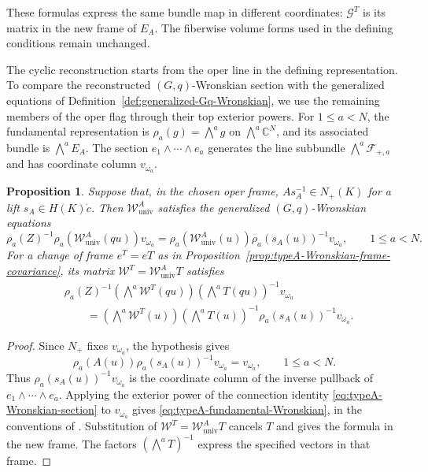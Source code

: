 \documentclass[11pt,leqno]{amsart}
\numberwithin{equation}{section}
\theoremstyle{plain}
\newtheorem{proposition}[theorem]{Proposition}
\theoremstyle{definition}
\theoremstyle{plain}
\theoremstyle{definition}
\theoremstyle{remark}
\begin{document}
These formulas express the same bundle map in different coordinates: $\mathscr G^T$ is its matrix in the new frame of $E_A$. The fiberwise volume forms used in the defining conditions remain unchanged.

The cyclic reconstruction starts from the oper line in the defining representation. To compare the reconstructed $(G,q)$-Wronskian section with the generalized equations of Definition~\ref{def:generalized-Gq-Wronskian}, we use the remaining members of the oper flag through their top exterior powers. For $1\le a<N$, the fundamental representation is $\rho_a(g)=\bigwedge^a g$ on $\bigwedge^a\mathbb C^N$, and its associated bundle is $\bigwedge^a E_A$. The section $e_1\wedge\cdots\wedge e_a$ generates the line subbundle $\bigwedge^a\mathcal F_{+,a}$ and has coordinate column $v_{\omega_a}$.

\begin{proposition}\label{prop:typeA-exterior-Wronskian}
Suppose that, in the chosen oper frame, $A s_A^{-1}\in N_+(K)$ for a lift $s_A\in H(K)\dot c$. Then $\mathscr W_{\mathrm{univ}}^A$ satisfies the generalized $(G,q)$-Wronskian equations
\begin{equation}\label{eq:typeA-fundamental-Wronskian}
 \rho_a(Z)^{-1}\rho_a(\mathscr W_{\mathrm{univ}}^A(qu))v_{\omega_a}
 =\rho_a(\mathscr W_{\mathrm{univ}}^A(u))
   \rho_a(s_A(u))^{-1}v_{\omega_a},
 \qquad 1\le a<N.
\end{equation}
For a change of frame $e^T=eT$ as in Proposition~\ref{prop:typeA-Wronskian-frame-covariance}, its matrix $\mathscr W^T=\mathscr W_{\mathrm{univ}}^A T$ satisfies
\begin{equation}\label{eq:typeA-Wronskian-lines-arbitrary-frame}
 \begin{aligned}
 &\rho_a(Z)^{-1}(\textstyle\bigwedge^a\mathscr W^T(qu))
             (\textstyle\bigwedge^aT(qu))^{-1}v_{\omega_a}\\
 &\qquad=(\textstyle\bigwedge^a\mathscr W^T(u))
             (\textstyle\bigwedge^aT(u))^{-1}
                    \rho_a(s_A(u))^{-1}v_{\omega_a}.
 \end{aligned}
\end{equation}
\end{proposition}
\begin{proof}
Since $N_+$ fixes $v_{\omega_a}$, the hypothesis gives
\begin{equation}\label{eq:typeA-oper-line}
 \rho_a(A(u))\rho_a(s_A(u))^{-1}v_{\omega_a}=v_{\omega_a},
 \qquad 1\le a<N.
\end{equation}
Thus $\rho_a(s_A(u))^{-1}v_{\omega_a}$ is the coordinate column of the inverse pullback of $e_1\wedge\cdots\wedge e_a$. Applying the exterior power of the connection identity \eqref{eq:typeA-Wronskian-section} to $v_{\omega_a}$ gives \eqref{eq:typeA-fundamental-Wronskian}, in the conventions of \cite[Definition~4.9, Eq.~(4.9)]{KZ2021}. Substitution of $\mathscr W^T=\mathscr W_{\mathrm{univ}}^A T$ cancels $T$ and gives the formula in the new frame. The factors $(\bigwedge^aT)^{-1}$ express the specified vectors in that frame.
\end{proof}
\end{document}
